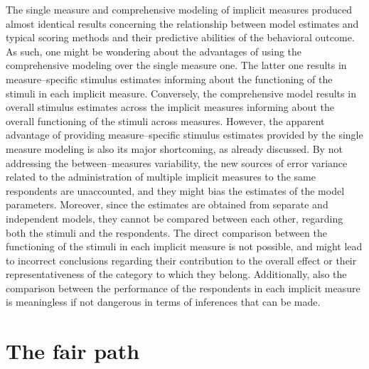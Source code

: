 \documentclass[12pt]{book}
\begin{document}
The single measure and comprehensive modeling of implicit measures produced almost identical results concerning the relationship between model estimates and typical scoring methods and their predictive abilities of the behavioral outcome. As such, one might be wondering about the advantages of using the comprehensive modeling over the single measure one. 
The latter one results in measure--specific stimulus estimates informing about the functioning of the stimuli in each implicit measure. Conversely, the comprehensive model results in overall stimulus estimates across the implicit measures informing about the overall functioning of the stimuli across measures.
However, the apparent advantage of providing measure--specific stimulus estimates provided by the single measure modeling is also its major shortcoming, as already discussed. 
By not addressing the between--measures variability, the new sources of error variance related to the administration of multiple implicit measures to the same respondents are unaccounted, and they might bias the estimates of the model parameters. Moreover, since the estimates are obtained from separate and independent models, they cannot be compared between  each other, regarding both the stimuli and the respondents.
The direct comparison between the functioning of the stimuli in each implicit measure is not possible, and might lead to incorrect conclusions regarding their contribution to the overall effect or their representativeness of the category to which they belong.
Additionally, also the comparison between the performance of the respondents in each implicit measure is meaningless if not dangerous in terms of inferences that can be made. 


\section{The fair path}
\end{document}
